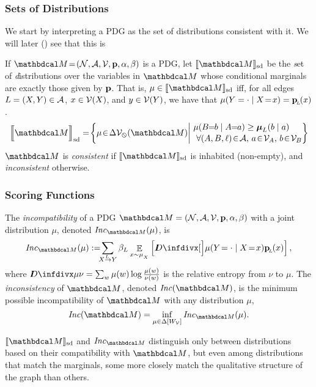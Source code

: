 \documentclass{article}
\begin{document}
	\subsubsection{Sets of Distributions}
	We start by interpreting a PDG as the set of distributions consistent with it.  We will later () see that this is 
	\begin{defn} \label{def:set-semantics} 
		If $\dg M\!=\!\pdgvars[]$ is a PDG, let $\SD{\dg M}$ be the \emph{s}et of \emph{d}istributions over the variables in $\dg M$ whose conditional marginals are exactly those given by $\mathbf p$.
		That is, $\mu \in \SD{\dg M}$ iff, for all edges $L = (X,Y) \in \mathcal A$,  $x \in \mathcal V(X)$,  and $y \in \mathcal V(Y)$, we have that $\mu(Y = \cdot \mid X\!=\! x) = \mathbf{p}_{\!_L\!}(x)$.
		{
			\[ \SD[\Big]{\dg M} = \!\left\{\mu \!\in\! \Delta \V_\none (\dg M) \middle|\!
			\begin{array}{l}
				\mu(B\!\! =\!\!b \mid A\!\!=\!\!a) \geq \boldsymbol\mu_L(b \mid a) \\[0.1em]
				~\text{$\forall (A, B,\ell) \!\in\! \Ed$, $a \!\in\!\mathcal V_A$, $b \!\in\! \mathcal V_B$} \end{array}\!\!\! \right\}\]
		}
		$\dg M$ is \emph{consistent} if $\SD{\dg M}$ is inhabited (non-empty), and \emph{inconsistent} otherwise.
	\end{defn}

\subsubsection{Scoring Functions}
\begin{defn}\label{def:inc}
	The \emph{incompatibility} of a PDG $\dg M = \pdgvars[]$ with
	a joint distribution $\mu$, denoted $\Inc_{\dg M}(\mu)$, is  
	\[
	\Inc_{\dg M }( \mu) := 
	\!\!\!\sum \alle \beta_L \E_{x \sim \mu_{_X}}
	\left[\kldiv[\Big]{ \mu(Y\!= \cdot\mid X \!=\! x) }{\bp(x) } \right] ,
	\]
	where $\kldiv{\mu}{\nu} = \sum_{w} \mu(w) \log\frac{\mu(w)}{\nu(w)}$ is the 
	relative entropy from $\nu$ to $\mu$.
%	
			The \emph{inconsistency} of $\dg M$, 
		denoted $\Inc(\dg M)$, is the
		minimum possible incompatibility of $\dg M$ with any
		distribution $\mu$,  
		\[ \Inc(\dg M) = \inf_{ \mu \in \Delta [W_{\cal V}]} \Inc_{\dg M}(\mu) . \]
\end{defn}
$\SD{\dg M}$ and $\Inc_{\dg M}$ distinguish only
between distributions based on their compatibility with
$\dg M$, but even among distributions that match the
marginals, some more closely match the qualitative structure
of the graph than others.  
\end{document}
